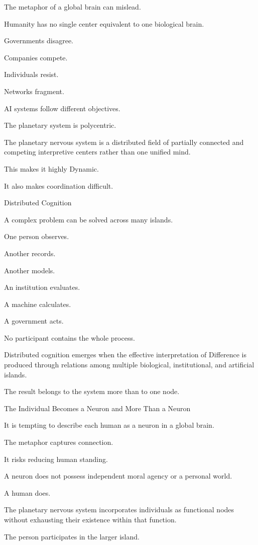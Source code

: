 The metaphor of a global brain can mislead.

Humanity has no single center equivalent to one biological brain.

Governments disagree.

Companies compete.

Individuals resist.

Networks fragment.

AI systems follow different objectives.

The planetary system is polycentric.

The planetary nervous system is a distributed field of partially connected and competing interpretive centers rather than one unified mind.

This makes it highly Dynamic.

It also makes coordination difficult.

Distributed Cognition

A complex problem can be solved across many islands.

One person observes.

Another records.

Another models.

An institution evaluates.

A machine calculates.

A government acts.

No participant contains the whole process.

Distributed cognition emerges when the effective interpretation of Difference is produced through relations among multiple biological, institutional, and artificial islands.

The result belongs to the system more than to one node.

The Individual Becomes a Neuron and More Than a Neuron

It is tempting to describe each human as a neuron in a global brain.

The metaphor captures connection.

It risks reducing human standing.

A neuron does not possess independent moral agency or a personal world.

A human does.

The planetary nervous system incorporates individuals as functional nodes without exhausting their existence within that function.

The person participates in the larger island.


